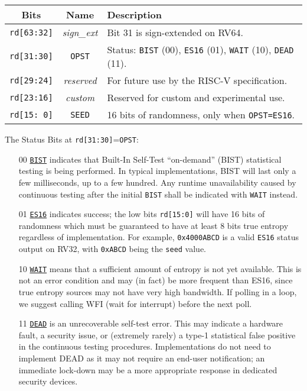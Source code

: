     \begin{center}
    \begin{tabular}{ccl}
    \toprule
    Bits    & Name  & Description \\
    \midrule
    \verb|rd[63:32]|    & {\it sign\_ext}
            & Bit 31 is sign-extended on RV64. \\
    \verb|rd[31:30]|    & \verb|OPST|
            & Status:   \verb|BIST| (00), \verb|ES16| (01),
                        \verb|WAIT| (10),   \verb|DEAD| (11). \\
    \verb|rd[29:24]|    & {\it reserved}
            & For future use by the RISC-V specification. \\
    \verb|rd[23:16]|    & {\it custom}
            & Reserved for custom and experimental use. \\
    \verb|rd[15: 0]|    & \verb|SEED|
            & 16 bits of randomness, only when \verb|OPST=ES16|.    \\
    \bottomrule
    \end{tabular}
    \end{center}

    The Status Bits at \verb|rd[31:30]|=\verb|OPST|:

\begin{itemize}
    \item[00]   \underline{\tt BIST}
    indicates that Built-In Self-Test ``on-demand'' (BIST) statistical
    testing is being performed. In typical implementations,
    BIST will last only a few milliseconds, up to a few hundred.
    Any runtime unavailability caused by continuous testing after the
    initial \verb|BIST| shall be indicated with \verb|WAIT| instead.

    \item[01]   \underline{\tt ES16}
    indicates success; the low bits \verb|rd[15:0]| will have 16 bits
    of randomness which must be guaranteed to have at least 8 bits true
    entropy regardless of implementation. For example, \verb|0x4000ABCD|
    is a valid \verb|ES16| status output on RV32, with \verb|0xABCD| being
    the \verb|seed| value.

    \item[10]   \underline{\tt WAIT}
    means that a sufficient amount of entropy is not yet available.
    This is not an error condition and may (in fact) be more frequent than
    ES16, since true entropy sources may not have very high bandwidth.
    If polling in a loop, we suggest calling WFI (wait for interrupt)
    before the next poll.

    \item[11]   \underline{\tt DEAD}
    is an unrecoverable self-test error. This may indicate a hardware
    fault, a security issue, or (extremely rarely) a type-1
    statistical false positive in the continuous testing procedures.
    Implementations do not need to implement DEAD as it may not require
    an end-user notification; an immediate lock-down may be a more
    appropriate response in dedicated security devices.
\end{itemize}

